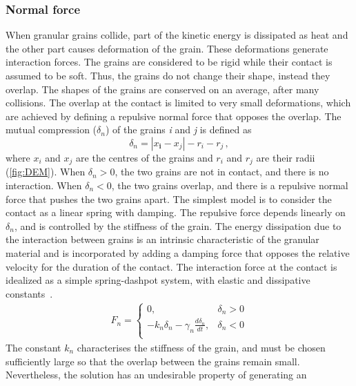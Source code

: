 \subsubsection*{Normal force}
When granular grains collide, part of the kinetic energy is dissipated as 
heat and the other part causes deformation of the grain. These deformations 
generate interaction forces. The grains are considered to be rigid while their 
contact is assumed to be soft. Thus, the grains do not change their shape, 
instead they overlap. The shapes of the grains are conserved on an average, 
after many collisions. The overlap at the contact is limited to very small 
deformations, which are achieved by defining a repulsive normal force that 
opposes the overlap. The mutual compression ($\delta_{n}$) of the grains 
\textit{i} and \textit{j} is defined as
%
\begin{equation}
 \delta_{n}=\left|x_{\mathbf{i}}-x_{\mathit{j}}\right|-r_{i}-r_{j} \,,
\label{eq:delta}
\end{equation}
%
where $x_{\mathit{i}}$ and $x_{\mathit{j}}$ are the centres of the grains and  
$r_{\mathit{i}}$ and $r_{\mathit{j}}$ are their radii (\cref{fig:DEM}). When 
$\delta_{n}>0$, the two grains are not in contact, and 
there is no interaction. When $\delta_{n}<0$, the two grains overlap, and 
there is a repulsive normal force that pushes the two grains apart. The 
simplest model is to consider the contact as a linear spring with damping. The 
repulsive force depends linearly on $\delta_{n}$, and is controlled by the 
stiffness of the grain. The energy dissipation due to the interaction between 
grains is an intrinsic characteristic of the granular material and is 
incorporated by adding a damping force that opposes the relative velocity for 
the duration of the contact. The interaction force at the contact is idealized 
as a simple spring-dashpot system, with elastic and dissipative 
constants~\citep{Luding1994}. 
%
\begin{align}
 {{F}_{n}}=
\begin{cases}
0, & {{\delta}_{n}}>0 \\
-{{k}_{n}}{{\delta}_{n}}-{{\gamma}_{n}}\frac{d{{\delta}_{n}}}{dt}, & 
{{\delta}_{n}}<0 \\
\end{cases}
\end{align} 
%
The constant ${k}_{n}$ characterises the stiffness of the grain, and must be 
chosen sufficiently large so that the overlap between the grains remain small. 
Nevertheless, the solution has an undesirable property of generating an 

